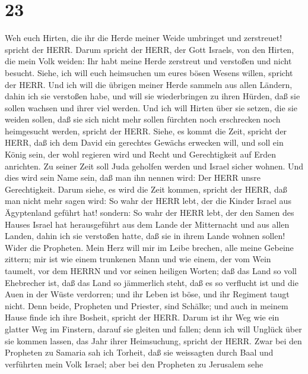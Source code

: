 \hypertarget{section-22}{%
\section{23}\label{section-22}}

 Weh euch Hirten, die ihr die Herde meiner Weide umbringet
und zerstreuet! spricht der HERR.  Darum spricht der HERR,
der Gott Israels, von den Hirten, die mein Volk weiden: Ihr habt meine
Herde zerstreut und verstoßen und nicht besucht. Siehe, ich will euch
heimsuchen um eures bösen Wesens willen, spricht der HERR. 
Und ich will die übrigen meiner Herde sammeln aus allen Ländern, dahin
ich sie verstoßen habe, und will sie wiederbringen zu ihren Hürden, daß
sie sollen wachsen und ihrer viel werden.  Und ich will
Hirten über sie setzen, die sie weiden sollen, daß sie sich nicht mehr
sollen fürchten noch erschrecken noch heimgesucht werden, spricht der
HERR.  Siehe, es kommt die Zeit, spricht der HERR, daß ich
dem David ein gerechtes Gewächs erwecken will, und soll ein König sein,
der wohl regieren wird und Recht und Gerechtigkeit auf Erden anrichten.
 Zu seiner Zeit soll Juda geholfen werden und Israel sicher
wohnen. Und dies wird sein Name sein, daß man ihn nennen wird: Der HERR
unsre Gerechtigkeit.  Darum siehe, es wird die Zeit kommen,
spricht der HERR, daß man nicht mehr sagen wird: So wahr der HERR lebt,
der die Kinder Israel aus Ägyptenland geführt hat!  sondern:
So wahr der HERR lebt, der den Samen des Hauses Israel hat herausgeführt
aus dem Lande der Mitternacht und aus allen Landen, dahin ich sie
verstoßen hatte, daß sie in ihrem Lande wohnen sollen! 
Wider die Propheten. Mein Herz will mir im Leibe brechen, alle meine
Gebeine zittern; mir ist wie einem trunkenen Mann und wie einem, der vom
Wein taumelt, vor dem HERRN und vor seinen heiligen Worten;
 daß das Land so voll Ehebrecher ist, daß das Land so
jämmerlich steht, daß es so verflucht ist und die Auen in der Wüste
verdorren; und ihr Leben ist böse, und ihr Regiment taugt nicht.
 Denn beide, Propheten und Priester, sind Schälke; und auch
in meinem Hause finde ich ihre Bosheit, spricht der HERR. 
Darum ist ihr Weg wie ein glatter Weg im Finstern, darauf sie gleiten
und fallen; denn ich will Unglück über sie kommen lassen, das Jahr ihrer
Heimsuchung, spricht der HERR.  Zwar bei den Propheten zu
Samaria sah ich Torheit, daß sie weissagten durch Baal und verführten
mein Volk Israel;  aber bei den Propheten zu Jerusalem sehe
